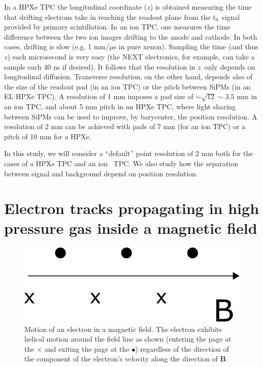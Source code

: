 \documentclass{JINST}
\begin{document}
In a HPXe TPC the longitudinal coordinate ($z$) is obtained measuring the time that drifting electrons take in reaching the readout plane from the $t_0$~signal provided by primary scintillation. In an ion TPC, one measures the time difference between the two ion images drifting to the anode and cathode.  In both cases, drifting is slow (e.g. 1 mm/$\mu$s in pure xenon). Sampling the time (and thus $z$) each microsecond is very easy (the NEXT electronics, for example, can take a sample each 40 ns if desired). It follows that the resolution in $z$~only depends on longitudinal diffusion. Transverse resolution, on the other hand, depends also of the size of the readout pad (in an ion TPC) or the pitch between SiPMs (in an EL HPXe TPC). A resolution of 1 mm imposes a pad size of $\sim \sqrt{12} \sim 3.5$ mm in an ion TPC, and about 5 mm pitch in an HPXe TPC, where light sharing between SiPMs can be used to improve, by barycenter, the position resolution. A resolution of 2 mm can be achieved with pads of 7 mm (for an ion TPC) or a pitch of 10 mm for a HPXe. 

In this study, we will consider a ``default'' point resolution of 2 mm both for the cases of a HPXe TPC and an ion \SEHF\ TPC. We also study how the separation between signal and background depend on position resolution.

\section{Electron tracks propagating in high pressure gas inside a magnetic field}\label{sec.magmotion}

\begin{figure}[!htb]
	\centering
	\includegraphics[scale=0.6]{fig/bfield_motion.pdf}
	\caption{\label{fig_bfieldmotion}Motion of an electron in a magnetic field.  The electron exhibits helical motion around the field line as shown (entering the page at the $\times$ and exiting the page at the $\bullet$) regardless of the direction of the component of the electron's velocity along the direction of $\mathbf{B}$.}
\end{figure}
\end{document}
